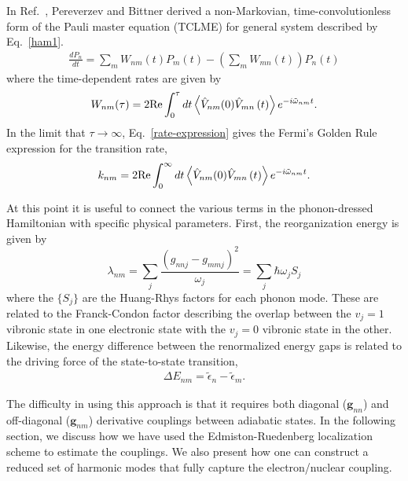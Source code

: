 In Ref.~\cite{pereverzev:104906}, Pereverzev and Bittner derived
a non-Markovian, time-convolutionless form of the Pauli master
equation (TCLME)  for general system described by Eq.~\ref{ham1}.
\begin{eqnarray}
\frac{dP_{n}}{dt} = \sum_{m} W_{nm}(t)P_{m}(t) - \left(\sum_{m} W_{mn}(t)\right)P_{n}(t)
\end{eqnarray}
where the time-dependent rates are given by
\begin{eqnarray}
W_{nm}(\tau)=2{\rm Re}\int_{0}^{\tau}dt\left\langle \hat V_{nm}(0)\hat V_{mn}\left(t\right)\right\rangle e^{-i\tilde\omega_{nm}t}.
\label{rate-expression}
\end{eqnarray}
In the limit that $\tau\to\infty$, Eq.~\ref{rate-expression} gives the Fermi's Golden Rule expression for the
transition rate,
\begin{eqnarray}
k_{nm}=2{\rm Re}\int_{0}^{\infty}dt\left\langle \hat V_{nm}(0)\hat V_{mn}\left(t\right)\right\rangle e^{-i\tilde\omega_{nm}t}.
\label{gr-expression}
\end{eqnarray}

At this point it is useful to connect the various terms in the phonon-dressed Hamiltonian
with specific physical parameters.
First, the reorganization energy is given by
\[
\lambda_{nm}=\sum_{j}\frac{\left(g_{nnj}-g_{mmj}\right)^{2}}{\omega_{j}} = \sum_{j}\hbar \omega_{j}S_{j}
\]
where  the $\{S_{j}\}$  are  the Huang-Rhys factors for each phonon mode.
These are related to the Franck-Condon factor
describing the overlap between the $v_j=1$ vibronic state in one electronic state
with the $v_j=0$ vibronic state in the other.
Likewise, the energy difference between the renormalized energy gaps is related to the
driving force of the state-to-state transition,
\begin{eqnarray}
\Delta E_{nm} = \tilde \epsilon_n-\tilde \epsilon_m.
\end{eqnarray}


The difficulty in using this approach is that
it requires both diagonal (${\mathbf g}_{nn}$) and off-diagonal  (${\mathbf g}_{nm}$) derivative couplings between
adiabatic states.    In the following section, we discuss how we have used the Edmiston-Ruedenberg localization scheme
to estimate the couplings\cite{RevModPhys.35.457}.   We also
present how one can construct a reduced set of harmonic modes that
fully capture the electron/nuclear coupling.
